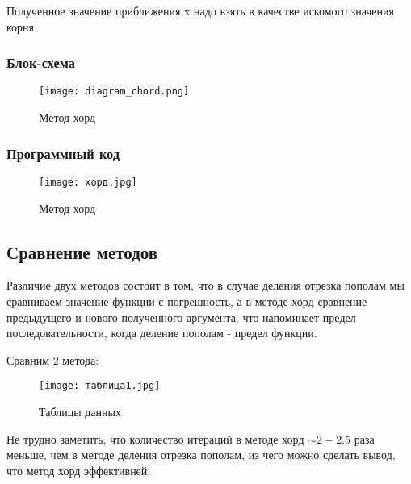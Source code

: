 \documentclass[a4paper,12pt]{article}
\begin{document}
Полученное значение приближения x надо взять в качестве искомого значения корня.

\subsubsection{Блок-схема}

\begin{figure}[!h]
\centering
\texttt{[image: diagram\_chord.png]}
\caption{Метод хорд}
\label{fig:method_chord_diagram}
\end{figure}

\newpage

\subsubsection{Программный код}

\begin{figure}[!h]
\centering
\texttt{[image: хорд.jpg]}
\caption{Метод хорд}
\label{fig:method_chord_code}
\end{figure}

\newpage

\subsection{Сравнение методов}

Различие двух методов состоит в том, что в случае деления отрезка пополам мы сравниваем значение функции с погрешность, а в методе хорд сравнение предыдущего и нового полученного аргумента, что напоминает предел последовательности, когда деление пополам - предел функции.

Сравним 2 метода:

\begin{figure}[!h]
\centering
\texttt{[image: таблица1.jpg]}
\caption{Таблицы данных}
\label{fig:tab1}
\end{figure}

Не трудно заметить, что количество итераций в методе хорд $\sim2-2.5$ раза меньше, чем в методе деления отрезка пополам, из чего можно сделать вывод, что метод хорд эффективней.
\end{document}
